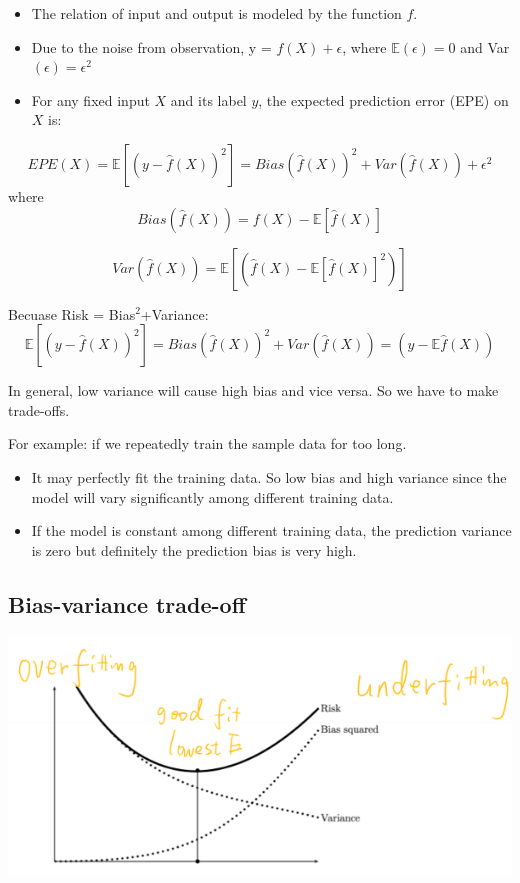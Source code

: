 \documentclass[letterpaper,12pt]{article}
\begin{document}
\begin{itemize}
    \item The relation of input and output is modeled by the function $f$.
    \item Due to the noise from observation, y = $f(X) + \epsilon$, where
          $\mathbb{E}(\epsilon)=0$ and Var$(\epsilon)={\epsilon}^2$
    \item For any fixed input $X$ and its label $y$, the expected prediction error (EPE)
          on $X$ is:
\end{itemize}

\[
    EPE(X)=\mathbb{E}[(y-\hat{f}(X))^2]=Bias(\hat{f}(X))^2+Var(\hat{f}(X))+\epsilon^2
\]
where
\[
    Bias(\hat{f}(X)) = f(X)-\mathbb{E}[\hat{f}(X)]
\]

\[
    Var(\hat{f}(X))=\mathbb{E}[(\hat{f}(X)-\mathbb{E}[\hat{f}(X)]^2)]
\]

Becuase Risk = Bias$^2$+Variance:
\[
    \mathbb{E}[(y-\hat{f}(X))^2]=Bias(\hat{f}(X))^2+Var(\hat{f}(X))=(y-\mathbb{E}\hat{f}(X))
\]

In general, low variance will cause high bias and vice versa. So we have to
make trade-offs.

For example: if we repeatedly train the sample data for too long.
\begin{itemize}
    \item It may perfectly fit the training data. So low bias and high variance since
          the model will vary significantly among different training data.
    \item If the model is constant among different training data, the prediction
          variance is zero but definitely the prediction bias is very high.
\end{itemize}

\subsection{Bias-variance trade-off}

\includegraphics*{./Image/Bias-variance trade-off.png}
\end{document}
